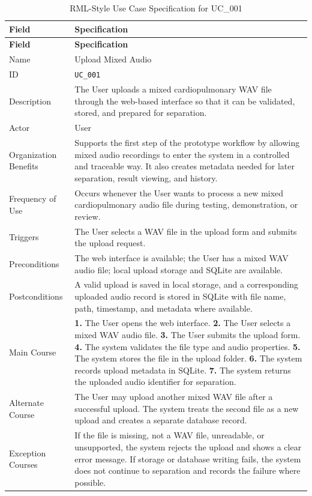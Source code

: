 \clearpage
\begin{longtable}{@{}p{} p{}@{}}
  \caption{RML-Style Use Case Specification for UC\_001}
  \label{tab:uc001-upload-mixed-audio} \\
  \toprule
  \textbf{Field} & \textbf{Specification} \\
  \midrule
  \endfirsthead
  \toprule
  \textbf{Field} & \textbf{Specification} \\
  \midrule
  \endhead
  \bottomrule
  \endfoot
  Name & Upload Mixed Audio \\
  ID & \texttt{UC\_001} \\
  Description & The User uploads a mixed cardiopulmonary WAV file through the web-based interface so that it can be validated, stored, and prepared for separation. \\
  Actor & User \\
  Organization Benefits & Supports the first step of the prototype workflow by allowing mixed audio recordings to enter the system in a controlled and traceable way. It also creates metadata needed for later separation, result viewing, and history. \\
  Frequency of Use & Occurs whenever the User wants to process a new mixed cardiopulmonary audio file during testing, demonstration, or review. \\
  Triggers & The User selects a WAV file in the upload form and submits the upload request. \\
  Preconditions & The web interface is available; the User has a mixed WAV audio file; local upload storage and SQLite are available. \\
  Postconditions & A valid upload is saved in local storage, and a corresponding uploaded audio record is stored in SQLite with file name, path, timestamp, and metadata where available. \\
  Main Course & \textbf{1.} The User opens the web interface. \newline
  \textbf{2.} The User selects a mixed WAV audio file. \newline
  \textbf{3.} The User submits the upload form. \newline
  \textbf{4.} The system validates the file type and audio properties. \newline
  \textbf{5.} The system stores the file in the upload folder. \newline
  \textbf{6.} The system records upload metadata in SQLite. \newline
  \textbf{7.} The system returns the uploaded audio identifier for separation. \\
  Alternate Course & The User may upload another mixed WAV file after a successful upload. The system treats the second file as a new upload and creates a separate database record. \\
  Exception Courses & If the file is missing, not a WAV file, unreadable, or unsupported, the system rejects the upload and shows a clear error message. If storage or database writing fails, the system does not continue to separation and records the failure where possible. \\
\end{longtable}

